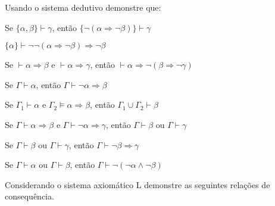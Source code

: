 
\begin{questao}\label{test:LPro4}
  Usando o sistema dedutivo demonstre que:
\end{questao}

\begin{exerList}
  \item Se $\{\alpha, \beta\} \vdash \gamma$, então $\{\neg(\alpha \Rightarrow \neg \beta)\} \vdash \gamma$
  \item $\{\alpha\} \vdash \neg \neg (\alpha \Rightarrow \neg \beta) \Rightarrow \neg \beta$
  \item Se $\vdash \alpha \Rightarrow \beta$ e $\vdash \alpha \Rightarrow \gamma$, então $\vdash \alpha \Rightarrow \neg (\beta \Rightarrow \neg \gamma)$
  \item Se $\Gamma \vdash \alpha$, então $\Gamma \vdash \neg \alpha \Rightarrow \beta$
  \item Se $\Gamma_1 \vdash \alpha$ e $\Gamma_2 \vDash \alpha \Rightarrow \beta$, então $\Gamma_1 \cup \Gamma_2 \vdash \beta$
  \item Se $\Gamma \vdash \alpha \Rightarrow \beta$ e $\Gamma \vdash \neg \alpha \Rightarrow \gamma$, então $\Gamma \vdash \beta$ ou $\Gamma \vdash \gamma$
  \item Se $\Gamma \vdash \beta$ ou $\Gamma \vdash \gamma$, então $\Gamma \vdash \neg \beta \Rightarrow \gamma$
  \item Se $\Gamma \vdash \alpha$ ou $\Gamma \vdash \beta$, então $\Gamma \vdash \neg (\neg \alpha \land \neg \beta)$
\end{exerList}

\begin{questao}\label{test:LPro5}
  Considerando o sistema axiomático L demonstre as seguintes relações de consequência.
\end{questao}

